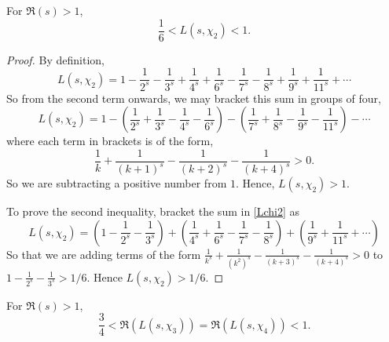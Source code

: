 \documentclass{unswmaths}
\begin{document}
    \begin{lemma}
        For $\Re(s) > 1$, 
        \begin{equation*}
            \frac{1}{6} < L(s,\chi_2) < 1.
        \end{equation*}
    \end{lemma}
    \begin{proof}
        By definition,
        \begin{equation}
        \label{Lchi2}
            L(s,\chi_2) = 1-\frac{1}{2^s}-\frac{1}{3^s}+\frac{1}{4^s}+\frac{1}{6^s}-\frac{1}{7^s}-\frac{1}{8^s}+\frac{1}{9^s}+\frac{1}{11^s}+\cdots
        \end{equation}
        So from the second term onwards, we may bracket this sum in groups of four,
        \begin{equation*}
            L(s,\chi_2) = 1-\left(\frac{1}{2^s}+\frac{1}{3^s}-\frac{1}{4^s}-\frac{1}{6^s}\right)-\left(\frac{1}{7^s}+\frac{1}{8^s}-\frac{1}{9^s}-\frac{1}{11^s}\right)-\cdots
        \end{equation*}
        where each term in brackets is of the form,
        \begin{equation*}
            \frac{1}{k}+\frac{1}{(k+1)^s}-\frac{1}{(k+2)^s}-\frac{1}{(k+4)^s} > 0.
        \end{equation*}
        So we are subtracting a positive number from $1$. Hence, $L(s,\chi_2) > 1$. 
        
        To prove the second inequality, bracket the sum in \ref{Lchi2} as
        \begin{equation*}
            L(s,\chi_2) = \left(1-\frac{1}{2^s}-\frac{1}{3^s}\right)+\left(\frac{1}{4^s}+\frac{1}{6^s}-\frac{1}{7^s}-\frac{1}{8^s}\right)+\left(\frac{1}{9^s}+\frac{1}{11^s}+\cdots\right)
        \end{equation*}
        So that we are adding terms of the form $\frac{1}{k^s}+\frac{1}{(k^2)^s}-\frac{1}{(k+3)^s}-\frac{1}{(k+4)^s} > 0$ to $1-\frac{1}{2^s}-\frac{1}{3^s} > 1/6$. Hence $L(s,\chi_2) > 1/6$.
    \end{proof}
    \begin{lemma}
        For $\Re(s) > 1$,
        \begin{equation*}
            \frac{3}{4} < \Re(L(s,\chi_3)) = \Re(L(s,\chi_4)) < 1.
        \end{equation*}
    \end{lemma}
\end{document}
